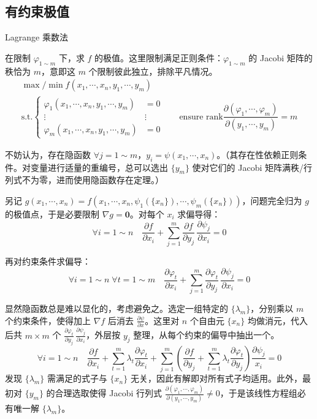 \documentclass[12pt, a4paper, UTF8, openany]{ctexbook}
\newcommand{\mat}[1]{\mathbf{#1}}
\begin{document}
        \subsection{有约束极值}
        Lagrange 乘数法

        在限制 $\varphi_{1 \sim m}$ 下，求 $f$ 的极值。这里限制满足正则条件：$\varphi_{1 \sim m}$ 的 Jacobi 矩阵的秩恰为 $m$，意即这 $m$ 个限制彼此独立，排除平凡情况。
        $$\begin{matrix}
            \max/\min f(x_1, \cdots, x_n, y_1, \cdots, y_m) & \\
            \text{s.t.} \begin{cases}
                \varphi_1(x_1, \cdots, x_n, y_1, \cdots, y_m) &= 0 \\
                \vdots & \vdots \\
                \varphi_m(x_1, \cdots, x_n, y_1, \cdots, y_m) &= 0
            \end{cases} &
            \quad\text{ensure }\mathrm{rank} \dfrac{\partial (\varphi_1, \cdots, \varphi_m)}{\partial (y_1, \cdots, y_m)} = m
        \end{matrix}$$

        不妨认为，存在隐函数 $\forall j = 1 \sim m$，$y_i = \psi(x_1, \cdots, x_n)$。（其存在性依赖正则条件。对变量进行适量的重编号，总可以选出 $\{y_m\}$ 使对它们的 Jacobi 矩阵满秩/行列式不为零，进而使用隐函数存在定理。）

        另记 $g(x_1, \cdots, x_n) = f(x_1, \cdots, x_n, \psi_1(\{x_n\}), \cdots, \psi_m(\{x_n\}))$，问题完全归为 $g$ 的极值点，于是必要限制 $\nabla g = \mat{0}$。对每个 $x_i$ 求偏导得：
        $$\forall i = 1 \sim n \quad \frac{\partial f}{\partial x_i} + \sum_{j = 1}^{m} \frac{\partial f}{\partial y_j} \, \frac{\partial \psi_j}{\partial x_i} = 0$$

        再对约束条件求偏导：
        $$\forall i = 1 \sim n \; \forall t = 1 \sim m \quad \frac{\partial \varphi_t}{\partial x_i} + \sum_{j = 1}^{m} \frac{\partial \varphi_t}{\partial y_j} \, \frac{\partial \psi_j}{\partial x_i} = 0$$

        显然隐函数总是难以显化的，考虑避免之。选定一组特定的 $\{\lambda_m\}$，分别乘以 $m$ 个约束条件，使得加上 $\nabla f$ 后消去 $\frac{\partial \psi}{\partial x}$。这里对 $n$ 个自由元 $\{x_n\}$ 均做消元，代入后共 $m \times m$ 个 $\frac{\partial \varphi_t}{\partial y_j} \, \frac{\partial \psi_j}{\partial x_i}$，外层按 $y_j$ 整理，从每个约束的偏导中抽出一个。
        $$\forall i = 1 \sim n \quad \boxed{\frac{\partial f}{\partial x_i} + \sum_{t = 1}^{m} \lambda_t \frac{\partial \varphi_t}{\partial x_i}}  + \sum_{j = 1}^{m} (\boxed{\frac{\partial f}{\partial y_j} + \sum_{t = 1}^{m} \lambda_t\frac{\partial \varphi_t}{\partial y_j}}  )\frac{\partial \psi_j}{x_i} = 0$$
        发现 $\{\lambda_m\}$ 需满足的式子与 $\{x_n\}$ 无关，因此有解即对所有式子均适用。此外，最初对 $\{y_m\}$ 的合理选取使得 Jacobi 行列式 $\frac{\partial(\varphi_1, \cdots, \varphi_m)}{\partial (y_1, \cdots, y_m)} \neq 0$，于是该线性方程组必有唯一解 $\{\lambda_m\}$。
\end{document}
